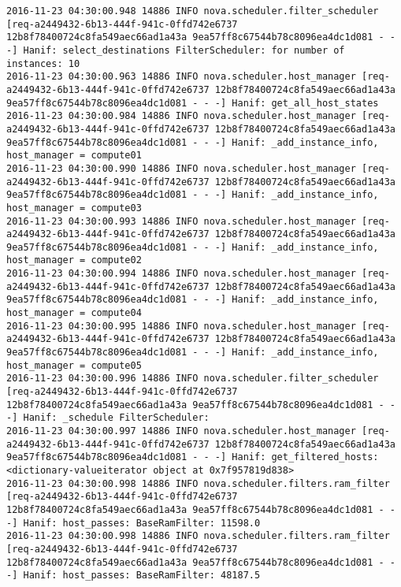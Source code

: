 \begin{lstlisting}[frame=single, caption={The filter scheduler log trace for 10 virtual instances}, label={lst:filterschedulercodetracelog10vi}, escapechar=|]
2016-11-23 04:30:00.948 14886 INFO nova.scheduler.filter_scheduler [req-a2449432-6b13-444f-941c-0ffd742e6737 12b8f78400724c8fa549aec66ad1a43a 9ea57ff8c67544b78c8096ea4dc1d081 - - -] Hanif: select_destinations FilterScheduler: for number of instances: 10
2016-11-23 04:30:00.963 14886 INFO nova.scheduler.host_manager [req-a2449432-6b13-444f-941c-0ffd742e6737 12b8f78400724c8fa549aec66ad1a43a 9ea57ff8c67544b78c8096ea4dc1d081 - - -] Hanif: get_all_host_states
2016-11-23 04:30:00.984 14886 INFO nova.scheduler.host_manager [req-a2449432-6b13-444f-941c-0ffd742e6737 12b8f78400724c8fa549aec66ad1a43a 9ea57ff8c67544b78c8096ea4dc1d081 - - -] Hanif: _add_instance_info, host_manager = compute01
2016-11-23 04:30:00.990 14886 INFO nova.scheduler.host_manager [req-a2449432-6b13-444f-941c-0ffd742e6737 12b8f78400724c8fa549aec66ad1a43a 9ea57ff8c67544b78c8096ea4dc1d081 - - -] Hanif: _add_instance_info, host_manager = compute03
2016-11-23 04:30:00.993 14886 INFO nova.scheduler.host_manager [req-a2449432-6b13-444f-941c-0ffd742e6737 12b8f78400724c8fa549aec66ad1a43a 9ea57ff8c67544b78c8096ea4dc1d081 - - -] Hanif: _add_instance_info, host_manager = compute02
2016-11-23 04:30:00.994 14886 INFO nova.scheduler.host_manager [req-a2449432-6b13-444f-941c-0ffd742e6737 12b8f78400724c8fa549aec66ad1a43a 9ea57ff8c67544b78c8096ea4dc1d081 - - -] Hanif: _add_instance_info, host_manager = compute04
2016-11-23 04:30:00.995 14886 INFO nova.scheduler.host_manager [req-a2449432-6b13-444f-941c-0ffd742e6737 12b8f78400724c8fa549aec66ad1a43a 9ea57ff8c67544b78c8096ea4dc1d081 - - -] Hanif: _add_instance_info, host_manager = compute05
2016-11-23 04:30:00.996 14886 INFO nova.scheduler.filter_scheduler [req-a2449432-6b13-444f-941c-0ffd742e6737 12b8f78400724c8fa549aec66ad1a43a 9ea57ff8c67544b78c8096ea4dc1d081 - - -] Hanif: _schedule FilterScheduler:
2016-11-23 04:30:00.997 14886 INFO nova.scheduler.host_manager [req-a2449432-6b13-444f-941c-0ffd742e6737 12b8f78400724c8fa549aec66ad1a43a 9ea57ff8c67544b78c8096ea4dc1d081 - - -] Hanif: get_filtered_hosts: <dictionary-valueiterator object at 0x7f957819d838>
2016-11-23 04:30:00.998 14886 INFO nova.scheduler.filters.ram_filter [req-a2449432-6b13-444f-941c-0ffd742e6737 12b8f78400724c8fa549aec66ad1a43a 9ea57ff8c67544b78c8096ea4dc1d081 - - -] Hanif: host_passes: BaseRamFilter: 11598.0
2016-11-23 04:30:00.998 14886 INFO nova.scheduler.filters.ram_filter [req-a2449432-6b13-444f-941c-0ffd742e6737 12b8f78400724c8fa549aec66ad1a43a 9ea57ff8c67544b78c8096ea4dc1d081 - - -] Hanif: host_passes: BaseRamFilter: 48187.5

\end{lstlisting}
